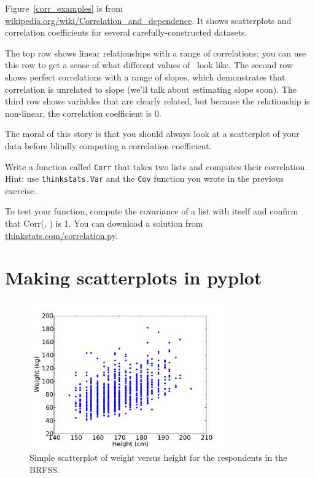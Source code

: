 \documentclass[12pt]{book}
\begin{document}
Figure~\ref{corr_examples} is from
\url{wikipedia.org/wiki/Correlation_and_dependence}.  It shows
scatterplots and correlation coefficients for several
carefully-constructed datasets.

The top row shows linear relationships with a range of correlations;
you can use this row to get a sense of what different values of
\myrho~look like.  The second row shows perfect correlations with a
range of slopes, which demonstrates that correlation is unrelated to
slope (we'll talk about estimating slope soon).  The third row shows
variables that are clearly related, but because the relationship is
non-linear, the correlation coefficient is 0.

The moral of this story is that you should always look at a scatterplot of
your data before blindly computing a correlation coefficient.

\begin{exercise}
Write a function called {\tt Corr} that takes two lists and
computes their correlation.  Hint: use {\tt thinkstats.Var} and
the {\tt Cov} function you wrote in the previous exercise.

To test your function, compute the covariance of a list with itself
and confirm that Corr(\X, \X) is 1.  You can download a solution
from \url{thinkstats.com/correlation.py}.

\end{exercise}


\section{Making scatterplots in pyplot}

\begin{figure}
\centerline{\includegraphics[height=2.5in]{figs/scatter1.pdf}}
\caption{Simple scatterplot of weight versus height for the respondents
in the BRFSS.}
\label{scatterplot1}
\end{figure}
\end{document}
